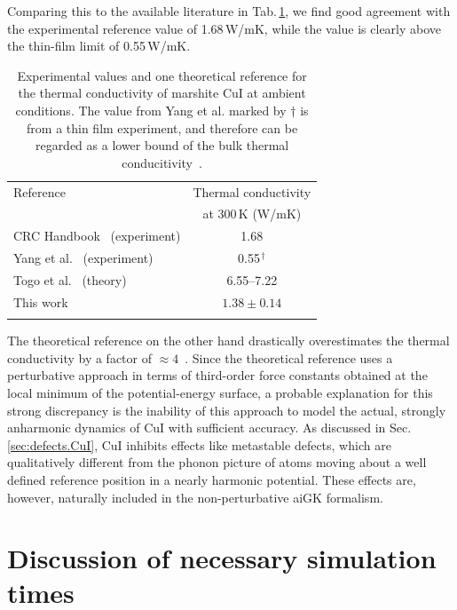 Comparing this to the available literature in Tab.\,\ref{tab:exp.CuI}, we find good agreement with the  experimental reference value of 1.68\,W/mK, while the value is clearly above the thin-film limit of 0.55\,W/mK.
\begin{table}[ht]
  \centering
  \selectfont
  \begin{tabular}{lc}
    \toprule
    Reference & Thermal conductivity \\
    & at 300\,K (W/mK) \\
    \midrule
    CRC Handbook~\cite{perry2016} (experiment) & 1.68 \\
    Yang et al.~\cite{yang2017} (experiment) &  0.55$^{\,\dagger}$ \\
    Togo et al.~\cite{phono3py} (theory) & 6.55--7.22 \\
    This work & $1.38 \pm 0.14$ \\
    \bottomrule
    \vspace{.5em}
  \end{tabular}
  \caption{Experimental values and one theoretical reference for the thermal conductivity of marshite CuI at ambient conditions. The value from Yang et al. marked by $\dagger$ is from a thin film experiment, and therefore can be regarded as a lower bound of the bulk thermal conducitivity~\cite{yang2017}.}
  \label{tab:exp.CuI}
\end{table}
The theoretical reference on the other hand drastically overestimates the thermal conductivity by a factor of $\approx 4$~\cite{phono3py}. Since the theoretical reference uses a perturbative approach in terms of third-order force constants obtained at the local minimum of the potential-energy surface, a probable explanation for this strong discrepancy is the inability of this approach to model the actual, strongly anharmonic dynamics of CuI with sufficient accuracy. As discussed in Sec.\,\ref{sec:defects.CuI}, CuI inhibits effects like metastable defects, which are qualitatively different from the phonon picture of atoms moving about a well defined reference position in a nearly harmonic potential. These effects are, however, naturally included in the non-perturbative aiGK formalism.

\section{Discussion of necessary simulation times}

